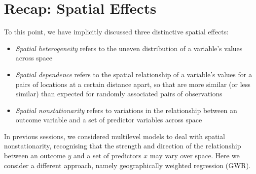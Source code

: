 \documentclass[]{book}
\newenvironment{Shaded}{\begin{snugshade}}{\end{snugshade}}
\newcommand{\KeywordTok}[1]{\textcolor[rgb]{0.13,0.29,0.53}{\textbf{#1}}}
\newcommand{\DataTypeTok}[1]{\textcolor[rgb]{0.13,0.29,0.53}{#1}}
\newcommand{\DecValTok}[1]{\textcolor[rgb]{0.00,0.00,0.81}{#1}}
\newcommand{\FloatTok}[1]{\textcolor[rgb]{0.00,0.00,0.81}{#1}}
\newcommand{\StringTok}[1]{\textcolor[rgb]{0.31,0.60,0.02}{#1}}
\newcommand{\CommentTok}[1]{\textcolor[rgb]{0.56,0.35,0.01}{\textit{#1}}}
\newcommand{\OperatorTok}[1]{\textcolor[rgb]{0.81,0.36,0.00}{\textbf{#1}}}
\newcommand{\NormalTok}[1]{#1}
\begin{document}
\begin{Shaded}
\end{Shaded}

\section{Recap: Spatial Effects}\label{recap-spatial-effects}

To this point, we have implicitly discussed three distinctive spatial
effects:

\begin{itemize}
\item
  \emph{Spatial heterogeneity} refers to the uneven distribution of a
  variable's values across space
\item
  \emph{Spatial dependence} refers to the spatial relationship of a
  variable's values for a pairs of locations at a certain distance
  apart, so that are more similar (or less similar) than expected for
  randomly associated pairs of observations
\item
  \emph{Spatial nonstationarity} refers to variations in the
  relationship between an outcome variable and a set of predictor
  variables across space
\end{itemize}

In previous sessions, we considered multilevel models to deal with
spatial nonstationarity, recognising that the strength and direction of
the relationship between an outcome \(y\) and a set of predictors \(x\)
may vary over space. Here we consider a different approach, namely
geographically weighted regression (GWR).
\end{document}
